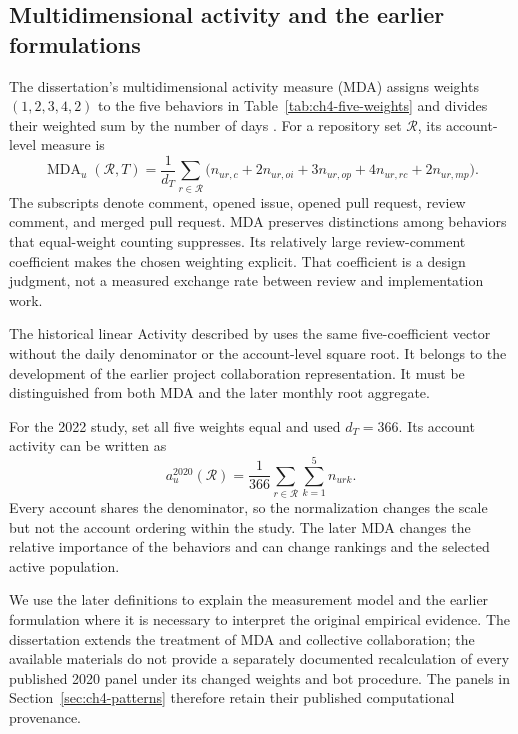 \subsection{Multidimensional activity and the earlier formulations}
The dissertation's multidimensional activity measure (MDA) assigns weights \((1,2,3,4,2)\) to the five behaviors in Table~\ref{tab:ch4-five-weights} and divides their weighted sum by the number of days \citep[Equation 5.1]{xia2024thesis}. For a repository set \(\mathcal R\), its account-level measure is
\begin{equation}
\operatorname{MDA}_u(\mathcal R,T)
=\frac{1}{d_T}\sum_{r\in\mathcal R}
\bigl(n_{ur,c}+2n_{ur,oi}+3n_{ur,op}+4n_{ur,rc}+2n_{ur,mp}\bigr).
\label{eq:ch4-mda}
\end{equation}
The subscripts denote comment, opened issue, opened pull request, review comment, and merged pull request. MDA preserves distinctions among behaviors that equal-weight counting suppresses. Its relatively large review-comment coefficient makes the chosen weighting explicit. That coefficient is a design judgment, not a measured exchange rate between review and implementation work.

The historical linear Activity described by \citet[Section 3.5, Equation 3.1]{zhao2025thesis} uses the same five-coefficient vector without the daily denominator or the account-level square root. It belongs to the development of the earlier project collaboration representation. It must be distinguished from both MDA and the later monthly root aggregate.

For the 2022 study, \citet[Section IV.A]{xia2022} set all five weights equal and used \(d_T=366\). Its account activity can be written as
\begin{equation}
a_u^{2020}(\mathcal R)=\frac{1}{366}
\sum_{r\in\mathcal R}\sum_{k=1}^{5}n_{urk}.
\label{eq:ch4-original}
\end{equation}
Every account shares the denominator, so the normalization changes the scale but not the account ordering within the study. The later MDA changes the relative importance of the behaviors and can change rankings and the selected active population.

We use the later definitions to explain the measurement model and the earlier formulation where it is necessary to interpret the original empirical evidence. The dissertation extends the treatment of MDA and collective collaboration; the available materials do not provide a separately documented recalculation of every published 2020 panel under its changed weights and bot procedure. The panels in Section~\ref{sec:ch4-patterns} therefore retain their published computational provenance.

